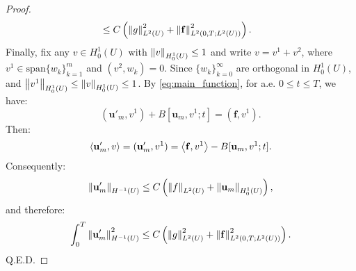 \begin{proof}
\begin{equation}
\begin{aligned}
            &\le C\left(\left\|g\right\|_{L^{2}(U)}^{2}+\left\|\mathbf{f}\right\|_{L^{2}(0,T;L^{2}(U))}^{2}\right).
        \end{aligned}
    \end{equation}
    Finally, fix any $v\in H_{0}^{1}(U)$ with $\left\|v\right\|_{H_{0}^{1}(U)}\le 1$ and write $v=v^{1}+v^{2}$, where $v^{1}\in\text{span}\{w_{k}\}_{k=1}^{m}$ and $(v^{2},w_{k})=0$. Since $\{w_{k}\}_{k=0}^{\infty}$ are orthogonal in $H_{0}^{1}(U)$, and $\left\|v^{1}\right\|_{H_{0}^{1}(U)}\le\left\|v\right\|_{H_{0}^{1}(U)}\le 1$. By \eqref{eq:main_function}, for a.e. $0\le t\le T$, we have:
    \begin{equation}
        (\mathbf{u}'_{m},v^{1})+B[\mathbf{u}_{m},v^{1};t]=(\mathbf{f},v^{1}).
    \end{equation}
    Then:
    \begin{equation}
        \left<\mathbf{u}'_{m},v\right>=(\mathbf{u}'_{m},v^{1})=\left<\mathbf{f},v^{1}\right>-B[\mathbf{u}_{m},v^{1};t].
    \end{equation}
    Consequently:
    \begin{equation}
        \left\|\mathbf{u}'_{m}\right\|_{H^{-1}(U)}\le C\left(\left\|f\right\|_{L^{2}(U)}+\left\|\mathbf{u}_{m}\right\|_{H_{0}^{1}(U)}\right),
    \end{equation}
    and therefore:
    \begin{equation}
        \int_{0}^{T}\left\|\mathbf{u}'_{m}\right\|_{H^{-1}(U)}^{2}\le C\left(\left\|g\right\|_{L^{2}(U)}^{2}+\left\|\mathbf{f}\right\|_{L^{2}(0,T;L^{2}(U))}^{2}\right).
    \end{equation}
    Q.E.D.
\end{proof}